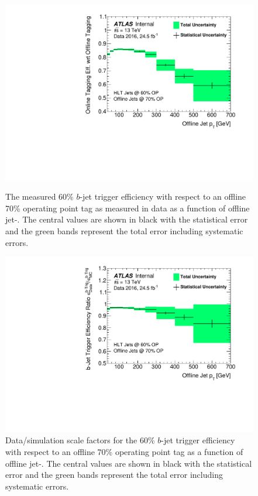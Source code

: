 \begin{figure}[!ht]
  \begin{center}
    \includegraphics[width=0.8\linewidth, angle=0]{figs/Trigger/btrigger_old/fullSyst_Efficiency_jetPt.pdf}
  \end{center}
  \caption{
    The measured 60\% $b$-jet trigger efficiency with respect to an offline 70\% operating point tag
    as measured in data as a function of offline jet-\pT.
    The central values are shown in black with the statistical error and the green bands represent the total error including systematic errors.
    \label{fig:bTrig_jetSys_eff}
  }
  \begin{center}
    \includegraphics[width=0.8\linewidth, angle=0]{figs/Trigger/btrigger_old/fullSyst_ScaleFactor_jetPt.pdf}
  \end{center}
  \caption{
    Data/simulation scale factors for the 60\% $b$-jet trigger efficiency with respect to an offline 70\% operating point tag
    as a function of offline jet-\pT.
    The central values are shown in black with the statistical error and the green bands represent the total error including systematic errors.
    \label{fig:bTrig_jetSys_SF}
  }
\end{figure}

